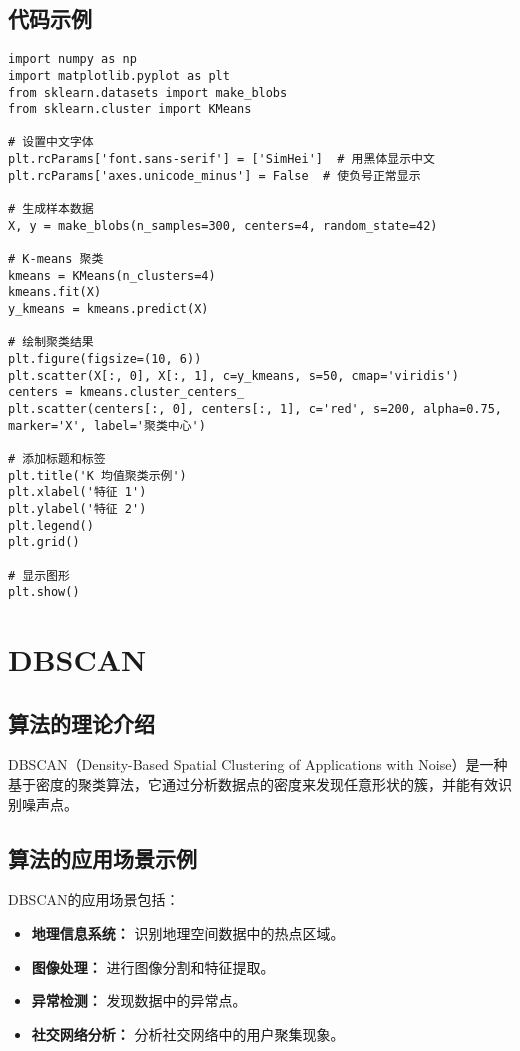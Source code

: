 \subsection*{代码示例}
\begin{lstlisting}
import numpy as np
import matplotlib.pyplot as plt
from sklearn.datasets import make_blobs
from sklearn.cluster import KMeans

# 设置中文字体
plt.rcParams['font.sans-serif'] = ['SimHei']  # 用黑体显示中文
plt.rcParams['axes.unicode_minus'] = False  # 使负号正常显示

# 生成样本数据
X, y = make_blobs(n_samples=300, centers=4, random_state=42)

# K-means 聚类
kmeans = KMeans(n_clusters=4)
kmeans.fit(X)
y_kmeans = kmeans.predict(X)

# 绘制聚类结果
plt.figure(figsize=(10, 6))
plt.scatter(X[:, 0], X[:, 1], c=y_kmeans, s=50, cmap='viridis')
centers = kmeans.cluster_centers_
plt.scatter(centers[:, 0], centers[:, 1], c='red', s=200, alpha=0.75, marker='X', label='聚类中心')

# 添加标题和标签
plt.title('K 均值聚类示例')
plt.xlabel('特征 1')
plt.ylabel('特征 2')
plt.legend()
plt.grid()

# 显示图形
plt.show()

\end{lstlisting}


\section{DBSCAN}
\subsection*{算法的理论介绍}
DBSCAN（Density-Based Spatial Clustering of Applications with Noise）是一种基于密度的聚类算法，它通过分析数据点的密度来发现任意形状的簇，并能有效识别噪声点。

\subsection*{算法的应用场景示例}
DBSCAN的应用场景包括：
\begin{itemize}
    \item \textbf{地理信息系统：} 识别地理空间数据中的热点区域。
    \item \textbf{图像处理：} 进行图像分割和特征提取。
    \item \textbf{异常检测：} 发现数据中的异常点。
    \item \textbf{社交网络分析：} 分析社交网络中的用户聚集现象。
\end{itemize}

